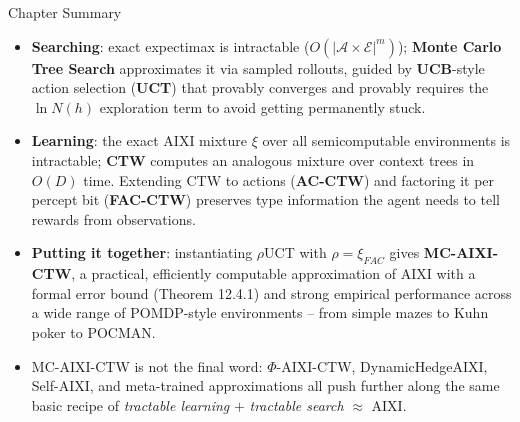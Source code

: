 \documentclass[aspectratio=169,10pt]{beamer}
\newcommand{\Acal}{\mathcal{A}}
\newcommand{\Ecal}{\mathcal{E}}
\begin{document}
\begin{frame}{Chapter Summary}
\begin{itemize}
\item \textbf{Searching}: exact expectimax is intractable ($O(|\Acal\times\Ecal|^m)$);
\textbf{Monte Carlo Tree Search} approximates it via sampled rollouts, guided by
\textbf{UCB}-style action selection (\textbf{UCT}) that provably converges and provably
requires the $\ln N(h)$ exploration term to avoid getting permanently stuck.
\item \textbf{Learning}: the exact AIXI mixture $\xi$ over all semicomputable environments
is intractable; \textbf{CTW} computes an analogous mixture over context trees in $O(D)$
time. Extending CTW to actions (\textbf{AC-CTW}) and factoring it per percept bit
(\textbf{FAC-CTW}) preserves type information the agent needs to tell rewards from
observations.
\item \textbf{Putting it together}: instantiating $\rho$UCT with $\rho=\xi_{FAC}$ gives
\textbf{MC-AIXI-CTW}, a practical, efficiently computable approximation of AIXI with a
formal error bound (Theorem 12.4.1) and strong empirical performance across a wide range
of POMDP-style environments -- from simple mazes to Kuhn poker to POCMAN.
\item MC-AIXI-CTW is not the final word: $\Phi$-AIXI-CTW, DynamicHedgeAIXI, Self-AIXI, and
meta-trained approximations all push further along the same basic recipe of
\emph{tractable learning} $+$ \emph{tractable search} $\approx$ AIXI.
\end{itemize}
\end{frame}
\end{document}
